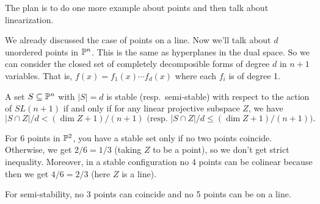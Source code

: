 
The plan is to do one more example about points and then talk about linearization.

We already discussed the case of points on a line. Now we'll talk about $d$ unordered points in $\mathbb{P}^n$. This is the same as hyperplanes in the dual space. So we can consider the closed set of completely decomposible forms of degree $d$ in $n+1$ variables. That is, $f(x)=f_1(x)\cdots f_d(x)$ where each $f_i$ is of degree 1.
\begin{proposition}
 A set $S\subseteq \mathbb{P}^n$ with $|S|=d$ is stable (resp.~semi-stable) with respect to the action of $SL(n+1)$ if and only if for any linear projective subspace $Z$, we have 
 \[
  |S\cap Z|/d < (\dim Z +1)/(n+1)\text{ (resp.~}|S\cap Z|/d \le (\dim Z +1)/(n+1)).
 \tag{$*$}\]
\end{proposition}
\begin{example}
 For 6 points in $\mathbb{P}^2$, you have a stable set only if no two points coincide. Otherwise, we get $2/6=1/3$ (taking $Z$ to be a point), so we don't get strict inequality. Moreover, in a stable configuration no 4 points can be colinear because then we get $4/6=2/3$ (here $Z$ is a line).
 
 For semi-stability, no 3 points can coincide and no 5 points can be on a line.
\end{example}
